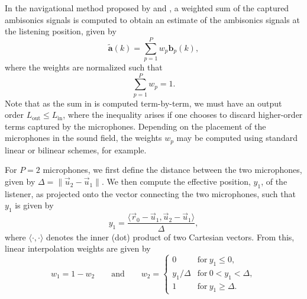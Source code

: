In the navigational method proposed by \citet{MarietteKatz2009} and \citet{Southern2009}, a weighted sum of the captured ambisonics signals is computed to obtain an estimate of the ambisonics signals at the listening position, given by
\begin{equation}\label{eq:03_Navigation_Techniques:Crossfading}
\mathbf{\tilde{a}}(k) = \sum_{p=1}^P w_p \mathbf{b}_p(k),
\end{equation}
where the weights are normalized such that
\begin{equation}\label{eq:03_Navigation_Techniques:Weight_Normalization}
\sum_{p=1}^P w_p = 1.
\end{equation}
Note that as the sum in  is computed term-by-term, we must have an output order $L_\text{out} \leq L_\text{in}$, where the inequality arises if one chooses to discard higher-order terms captured by the microphones.
Depending on the placement of the microphones in the sound field, the weights $w_p$ may be computed using standard linear or bilinear schemes, for example.

For $P = 2$ microphones, we first define the distance between the two microphones, given by $\Delta = \|\vec{u}_2 - \vec{u}_1\|$.
We then compute the effective position, $y_1$, of the listener, as projected onto the vector connecting the two microphones, such that $y_1$ is given by
\begin{equation}
y_1 = \frac{\langle \vec{r}_0 - \vec{u}_1, \vec{u}_2 - \vec{u}_1 \rangle}{\Delta},
\end{equation}
where $\langle \cdot, \cdot \rangle$ denotes the inner (dot) product of two Cartesian vectors.
From this, linear interpolation weights are given by
\begin{equation}\label{eq:03_Navigation_Techniques:Linear_Interpolation_Weights}
w_1 = 1 - w_2
\quad\quad\text{and}\quad\quad
w_2 = 
\begin{cases}
0 & \text{for}~y_1 \leq 0,\\
y_1/\Delta & \text{for}~0 < y_1 < \Delta,\\
1 & \text{for}~y_1 \geq \Delta.
\end{cases}
\end{equation}
